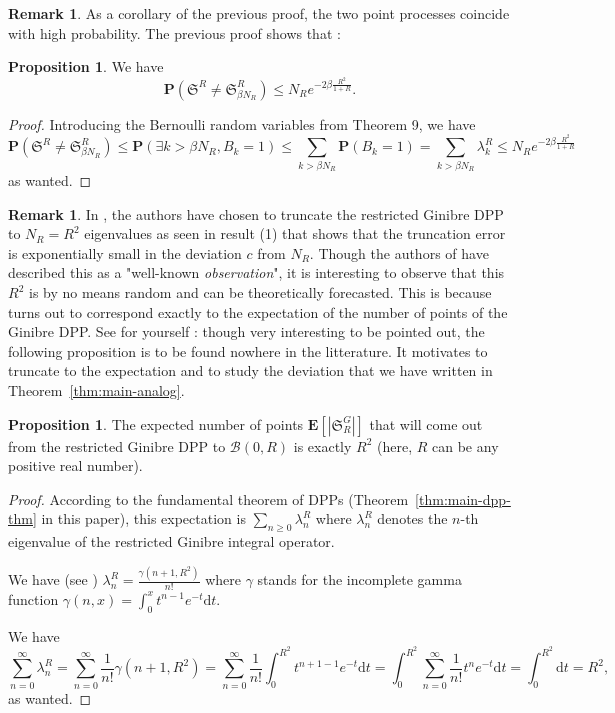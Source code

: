\documentclass[11pt]{article}
\theoremstyle{plain}
\theoremstyle{definition}
\newtheorem{proposition}[definition]{Proposition}
\newtheorem{remark}[definition]{Remark}
\begin{document}
\begin{remark}
    As a corollary of the previous proof, the two point processes coincide with high probability. The previous proof shows that :
\end{remark}

\begin{proposition} We have
\[
\mathbf{P}(\mathfrak{S}^R \neq \mathfrak{S}_{\beta N_R}^R) \leqslant N_R e^{-2\beta \frac{R^2}{1+R}}.
\]
\end{proposition}

\begin{proof}
Introducing the Bernoulli random variables from Theorem 9, we have
\[
\mathbf{P}(\mathfrak{S}^R \neq \mathfrak{S}_{\beta N_R}^R) \leqslant \mathbf{P}(\exists k > \beta N_R, B_k = 1) \leqslant \sum_{k > \beta N_R} \mathbf{P}(B_k = 1) = \sum_{k > \beta N_R} \lambda_k^R \leqslant N_R e^{-2\beta \frac{R^2}{1+R}}
\]
as wanted.
\end{proof}

\begin{remark}
    In \cite{DecreusefondMoroz2021}, the authors have chosen to truncate the restricted Ginibre DPP to $N_R = R^2$ eigenvalues as seen in result (1) that shows that the truncation error is exponentially small in the deviation $c$ from $N_R$. Though the authors of \cite{DecreusefondMoroz2021} have described this as a "well-known \textit{observation}", it is interesting to observe that this $R^2$ is by no means random and can be theoretically forecasted. This is because turns out to correspond exactly to the expectation of the number of points of the Ginibre DPP. See for yourself : though very interesting to be pointed out, the following proposition is to be found nowhere in the litterature. It motivates to truncate to the expectation and to study the deviation that we have written in Theorem~\ref{thm:main-analog}.
\end{remark}

\begin{proposition} The expected number of points $\mathbf{E}[|\mathfrak{S}_R^G|]$ that will come out from the restricted Ginibre DPP to $\mathcal{B}(0,R)$ is exactly $R^2$ (here, $R$ can be any positive real number).
\end{proposition}

\begin{proof}

According to the fundamental theorem of DPPs (Theorem~\ref{thm:main-dpp-thm} in this paper), this expectation is $\sum\limits_{n \ge 0} \lambda_n^R$ where $\lambda_n^R$ denotes the $n$-th eigenvalue of the restricted Ginibre integral operator.

We have (see \cite{DecreusefondMoroz2021}) $\lambda_n^R = \frac{\gamma(n+1, R^2)}{n!}$ where $\gamma$ stands for the incomplete gamma function $\gamma(n,x) = \int_0^x t^{n-1}e^{-t} \mathrm dt$.

We have
\[
\sum_{n=0}^\infty \lambda_n^R = \sum_{n=0}^\infty \frac{1}{n!} \gamma(n+1, R^2) = \sum_{n=0}^\infty \frac{1}{n!} \int_0^{R^2} t^{n+1-1} e^{-t} \mathrm dt = \int_0^{R^2} \sum_{n=0}^\infty \frac{1}{n!} t^n e^{-t} \mathrm dt = \int_0^{R^2} \mathrm dt = R^2,
\]
as wanted.
\end{proof}
\end{document}
